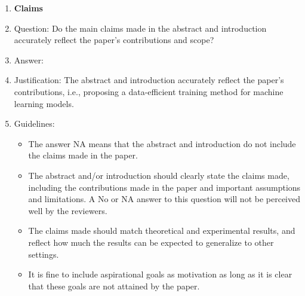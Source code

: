 \documentclass{article}
\numberwithin{equation}{section}
\theoremstyle{definition}
\begin{document}
 



\begin{enumerate}

\item {\bf Claims}
    \item[] Question: Do the main claims made in the abstract and introduction accurately reflect the paper's contributions and scope?
    \item[] Answer: \answerYes{} %
    \item[] Justification: The abstract and introduction accurately reflect the paper's contributions, i.e.,  proposing a data-efficient training method for machine learning models.
    \item[] Guidelines:
    \begin{itemize}
        \item The answer NA means that the abstract and introduction do not include the claims made in the paper.
        \item The abstract and/or introduction should clearly state the claims made, including the contributions made in the paper and important assumptions and limitations. A No or NA answer to this question will not be perceived well by the reviewers. 
        \item The claims made should match theoretical and experimental results, and reflect how much the results can be expected to generalize to other settings. 
        \item It is fine to include aspirational goals as motivation as long as it is clear that these goals are not attained by the paper. 
    \end{itemize}


\end{enumerate}
\end{document}
